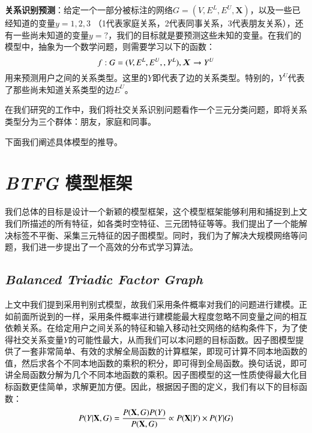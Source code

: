 \begin{problem}
    \label{relation-problem}
     \textbf{关系识别预测}：给定一个一部分被标注的网络$G = (V, E^L, E^U, \bm{X})$，以及一些已经知道的变量$y = 1, 2, 3$ （1代表家庭关系，2代表同事关系，3代表朋友关系），还有一些尚未知道的变量$y = ?$，我们的目标就是要预测这些未知的变量。在我们的模型中，抽象为一个数学问题，则需要学习以下的函数：
     \begin{displaymath}
        {f: G= (V, E^{L}, E^{U}, , Y^{L}),\bm{X} \rightarrow Y^{U}} \\
     \end{displaymath}
     \qquad 用来预测用户之间的关系类型。这里的$Y$即代表了边的关系类型。特别的，$Y^U$代表了那些尚未知道关系类型的边$E^U$。

\end{problem}

在我们研究的工作中，我们将社交关系识别问题看作一个三元分类问题，即将关系类型分为三个群体：朋友，家庭和同事。


下面我们阐述具体模型的推导。


\section{\textit{BTFG} 模型框架}

我们总体的目标是设计一个新颖的模型框架，这个模型框架能够利用和捕捉到上文我们所描述的所有特征，如各类时空特征、三元团特征等等。我们提出了一个能解决标签不平衡、采集三元特征的因子图模型。同时，我们为了解决大规模网络等问题，我们进一步提出了一个高效的分布式学习算法。


\subsection{\textit{Balanced Triadic Factor Graph}}
上文中我们提到采用判别式模型，故我们采用条件概率对我们的问题进行建模。正如前面所说到的一样，采用条件概率进行建模能最大程度忽略不同变量之间的相互依赖关系。在给定用户之间关系的特征和输入移动社交网络的结构条件下，为了使得社交关系变量$Y$的可能性最大，从而我们可以本问题的目标函数。因子图模型提供了一套非常简单、有效的求解全局函数的计算框架，即现可计算不同本地函数的值，然后求各个不同本地函数的乘积的积分，即可得到全局函数。换句话说，即可讲全局函数分解为几个不同本地函数的乘积。因子图模型的这一性质使得最大化目标函数更佳简单，求解更加方便。因此，根据因子图的定义，我们有以下的目标函数：\\
\begin{equation}
P(Y|\textbf{X},G) = \frac{P(\textbf{X},G)P(Y)}{P(\textbf{X},G)} \propto P(\textbf{X}| Y) \times P(Y|G) \\
\end{equation}

